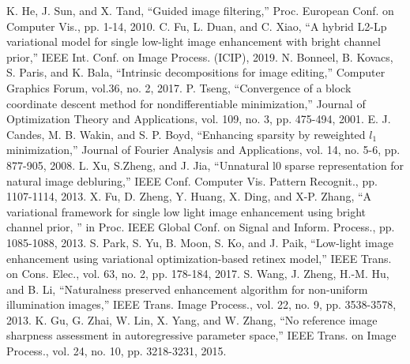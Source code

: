 \begin{thebibliography}{99}
 K. He, J. Sun, and X. Tand, ``Guided image filtering,'' Proc. European Conf. on Computer Vis., pp. 1-14, 2010.
 C. Fu, L. Duan, and C. Xiao, ``A hybrid L2-Lp variational model for single low-light image enhancement with bright channel prior,'' IEEE Int. Conf. on Image Process. (ICIP), 2019.
 N. Bonneel, B. Kovacs, S. Paris, and K. Bala, ``Intrinsic decompositions for image editing,'' Computer Graphics Forum, vol.36, no. 2, 2017.
 P. Tseng, ``Convergence of a block coordinate descent method for nondifferentiable minimization,'' Journal of Optimization Theory and Applications, vol. 109, no. 3, pp. 475-494, 2001.
 E. J. Candes, M. B. Wakin, and S. P. Boyd, ``Enhancing sparsity by reweighted $l_{1}$ minimization,'' Journal of Fourier Analysis and Applications, vol. 14, no. 5-6, pp. 877-905, 2008. 
 L. Xu, S.Zheng, and J. Jia, ``Unnatural l0 sparse representation for natural image debluring,'' IEEE Conf. Computer Vis. Pattern Recognit., pp. 1107-1114, 2013.
 X. Fu, D. Zheng, Y. Huang, X. Ding, and X-P. Zhang, ``A variational framework for single low light image enhancement using bright channel prior, '' in Proc. IEEE Global Conf. on Signal and Inform. Process., pp. 1085-1088, 2013.
 S. Park, S. Yu, B. Moon, S. Ko, and J. Paik, ``Low-light image enhancement using variational optimization-based retinex model,'' IEEE Trans. on Cons. Elec., vol. 63, no. 2, pp. 178-184, 2017.
 S. Wang, J. Zheng, H.-M. Hu, and B. Li, ``Naturalness preserved enhancement algorithm for non-uniform illumination images,'' IEEE Trans. Image Process., vol. 22, no. 9, pp. 3538-3578, 2013.
 K. Gu, G. Zhai, W. Lin, X. Yang, and W. Zhang, ``No reference image sharpness assessment in autoregressive parameter space,'' IEEE Trans. on Image Process., vol. 24, no. 10, pp. 3218-3231, 2015.
\end{thebibliography}